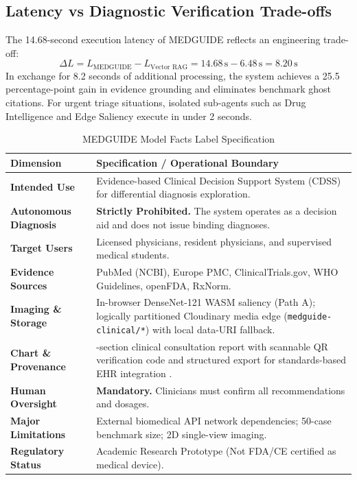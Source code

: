 \documentclass[journal,10pt,twocolumn]{IEEEtran}
\begin{document}
\subsection{Latency vs Diagnostic Verification Trade-offs}
The 14.68-second execution latency of MEDGUIDE reflects an engineering trade-off:
\begin{equation}
\Delta L = L_{\text{MEDGUIDE}} - L_{\text{Vector RAG}} = 14.68\,\text{s} - 6.48\,\text{s} = 8.20\,\text{s}
\end{equation}
In exchange for 8.2 seconds of additional processing, the system achieves a 25.5 percentage-point gain in evidence grounding and eliminates benchmark ghost citations. For urgent triage situations, isolated sub-agents such as Drug Intelligence and Edge Saliency execute in under 2 seconds.

\begin{table}[!t]
\centering
\caption{MEDGUIDE Model Facts Label Specification}
\label{tab:model_facts}
\footnotesize
\setlength{\tabcolsep}{4pt}
\begin{tabularx}{\columnwidth}{>{\raggedright\arraybackslash}p{2.4cm}>{\raggedright\arraybackslash}X}
\toprule
\textbf{Dimension} & \textbf{Specification / Operational Boundary} \\
\midrule
\textbf{Intended Use} & Evidence-based Clinical Decision Support System (CDSS) for differential diagnosis exploration. \\
\textbf{Autonomous Diagnosis} & \textbf{Strictly Prohibited.} The system operates as a decision aid and does not issue binding diagnoses. \\
\textbf{Target Users} & Licensed physicians, resident physicians, and supervised medical students. \\
\textbf{Evidence Sources} & PubMed (NCBI), Europe PMC, ClinicalTrials.gov, WHO Guidelines, openFDA, RxNorm. \\
\textbf{Imaging \& Storage} & In-browser DenseNet-121 WASM saliency (Path A); logically partitioned Cloudinary media edge (\texttt{medguide-clinical/*}) with local data-URI fallback. \\
\textbf{Chart \& Provenance} & 7-section clinical consultation report with scannable QR verification code and structured export for standards-based EHR integration \cite{weed1968medical, mandel2016smart, cdshooks2024}. \\
\textbf{Human Oversight} & \textbf{Mandatory.} Clinicians must confirm all recommendations and dosages. \\
\textbf{Major Limitations} & External biomedical API network dependencies; 50-case benchmark size; 2D single-view imaging. \\
\textbf{Regulatory Status} & Academic Research Prototype (Not FDA/CE certified as medical device). \\
\bottomrule
\end{tabularx}
\end{table}
\end{document}
